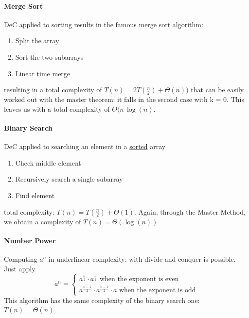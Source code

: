 \documentclass{article}
\begin{document}
			\paragraph{Merge Sort}
				DeC applied to sorting results in the famous merge sort algorithm:
				\begin{enumerate}
					\item Split the array
					\item Sort the two subarrays
					\item Linear time merge
				\end{enumerate}
				resulting in a total complexity of $T(n) = 2T(\frac{n}{2}) + \Theta(n))$ that can be easily worked out with the master theorem: it falls in the second case with k = 0. This leaves us with a total complexity of $\Theta(n\, \log(n)$.

			\paragraph{Binary Search}
				DeC applied to searching an element in a \underline{sorted} array
				\begin{enumerate}
					\item Check middle element
					\item Recursively search a single subarray
					\item Find element
				\end{enumerate}
				total complexity: $T(n) = T(\frac{n}{2}) + \Theta(1)$. Again, through the Master Method, we obtain a complexity of $T(n) = \Theta(\log(n))$

			\paragraph{Number Power}
				Computing $a^n$ in underlinear complexity: with divide and conquer is possible. Just apply
				\begin{equation}
					a^n = 
					\begin{cases}
						a^{\frac{n}{2}}\cdot a^{\frac{n}{2}} \text{ when the exponent is even}\\
						a^{\frac{n-1}{2}}\cdot a^{\frac{n-1}{2}} \cdot a \text{ when the exponent is odd}
					\end{cases}
				\end{equation}
				This algorithm has the same complexity of the binary search one: $T(n) = \Theta(n)$
\end{document}
